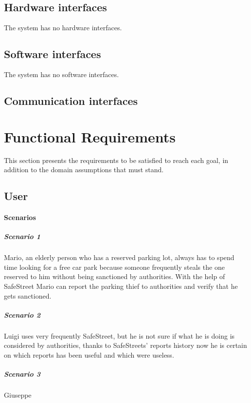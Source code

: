 \documentclass[12pt,a4paper]{report}
\begin{document}
		\subsection{Hardware interfaces}
			The system has no hardware interfaces.
		\subsection{Software interfaces}
			The system has no software interfaces.
		\subsection{Communication interfaces}
	\section{Functional Requirements}
		This section presents the requirements to be satisfied to reach each goal, in addition to the domain assumptions that must stand.
		\subsection{User} 
			\paragraph{Scenarios}
				\subparagraph{Scenario 1}
					Mario, an elderly person who has a reserved parking lot, always has to spend time looking for a free
					car park because someone frequently steals the one reserved to him without being sanctioned by
					authorities. With the help of SafeStreet Mario can report the parking thief to authorities and verify
					that he gets sanctioned.
					
				\subparagraph{Scenario 2}
					Luigi uses very frequently SafeStreet, but he is not sure if what he is doing is considered by authorities,
					thanks to SafeStreets' reports history now he is certain on which reports has been useful and which
					were useless.
					
				\subparagraph{Scenario 3}
					Giuseppe	
					
\end{document}
